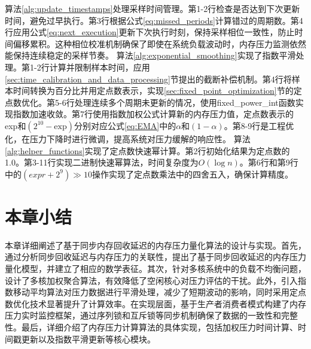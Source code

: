 算法\ref{alg:update_timestamps}处理采样时间管理。第1-2行检查是否达到下次更新时间，避免过早执行。第3行根据公式\ref{eq:missed_periods}计算错过的周期数。第4行应用公式\ref{eq:next_execution}更新下次执行时刻，保持采样相位一致性，防止时间偏移累积。这种相位校准机制确保了即使在系统负载波动时，内存压力监测依然能保持连续稳定的采样节奏。
算法\ref{alg:exponential_smoothing}实现了指数平滑处理。第1-2行计算并限制样本时间，应用\ref{sec:time_calibration_and_data_processing}节提出的截断补偿机制。第4行将样本时间转换为百分比并用定点数表示，实现\ref{sec:fixed_point_optimization}节的定点数优化。第5-6行处理连续多个周期未更新的情况，使用fixed\_power\_int函数实现指数加速收敛。第7行使用指数加权公式计算新的内存压力值，定点数表示的exp和$(2^{10}-\text{exp})$分别对应公式\ref{eq:EMA}中的\(\alpha\)和\((1-\alpha)\)。第8-9行是工程优化，在压力下降时进行微调，提高系统对压力缓解的响应性。
算法\ref{alg:helper_functions}实现了定点数快速幂计算。第2行初始化结果为定点数的1.0。第3-11行实现二进制快速幂算法，时间复杂度为$O(\log n)$。第6行和第9行中的$(expr + 2^9) \gg 10$操作实现了定点数乘法中的四舍五入，确保计算精度。




\section{本章小结}
本章详细阐述了基于同步内存回收延迟的内存压力量化算法的设计与实现。首先，通过分析同步回收延迟与内存压力的关联性，提出了基于同步回收延迟的内存压力量化模型，并建立了相应的数学表征。其次，针对多核系统中的负载不均衡问题，设计了多核加权聚合算法，有效降低了空闲核心对压力评估的干扰。此外，引入指数移动平均算法对压力数据进行平滑处理，减少了短期波动的影响，同时采用定点数优化技术显著提升了计算效率。在实现层面，基于生产者消费者模式构建了内存压力实时监控框架，通过序列锁和互斥锁等同步机制确保了数据的一致性和完整性。最后，详细介绍了内存压力计算算法的具体实现，包括加权压力时间计算、时间戳更新以及指数平滑更新等核心模块。